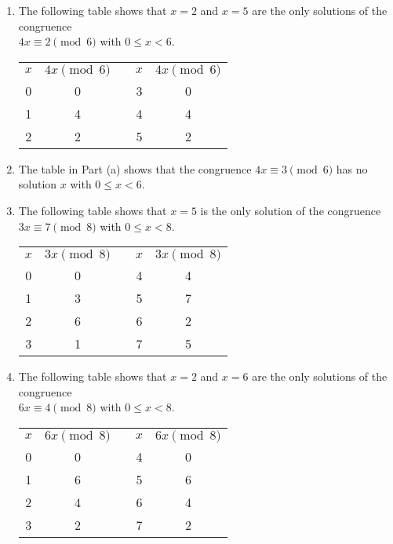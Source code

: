 \documentclass[11pt]{article}
\begin{document}
\begin{enumerate}
  \item The following table shows that $x = 2$ and  $x = 5$ are the only solutions of the congruence \\ $4x \equiv 2 \pmod 6$ with $0 \leq x < 6$.

\begin{center}
\begin{tabular}[t]{ c | c  c  c | c } 
$x$  &  $4x \pmod 6$ & & $x$  &  $4x \pmod 6$ \\ \cline{1-2} \cline{4-5}
0  &  0  &  &  3  &  0 \\ \cline{1-2} \cline{4-5}
1  &  4  &  &  4  &  4 \\ \cline{1-2} \cline{4-5}
2  &  2  &  &  5  &  2 \\ \cline{1-2} \cline{4-5}
\end{tabular}
\end{center}


  \item The table in Part (a) shows that the congruence $4x \equiv 3 \pmod 6$ has no solution $x$ with $0 \leq x < 6$.



\item The following table shows that $x = 5$  is the only solution of the congruence \\ $3x \equiv 7 \pmod 8$ with $0 \leq x < 8$.

\begin{center}
\begin{tabular}[t]{ c | c  c  c | c } 
$x$  &  $3x \pmod 8$ & & $x$  &  $3x \pmod 8$ \\ \cline{1-2} \cline{4-5}
0  &  0  &  &  4  &  4 \\ \cline{1-2} \cline{4-5}
1  &  3  &  &  5  &  7 \\ \cline{1-2} \cline{4-5}
2  &  6  &  &  6  &  2 \\ \cline{1-2} \cline{4-5}
3  &  1  &  &  7  &  5 \\ \cline{1-2} \cline{4-5}
\end{tabular}
\end{center}


\item The following table shows that $x = 2$ and  $x = 6$ are the only solutions of the congruence \\ $6x \equiv 4 \pmod 8$ with $0 \leq x < 8$.

\begin{center}
\begin{tabular}[t]{ c | c  c  c | c } 
$x$  &  $6x \pmod 8$ & & $x$  &  $6x \pmod 8$ \\ \cline{1-2} \cline{4-5}
0  &  0  &  &  4  &  0 \\ \cline{1-2} \cline{4-5}
1  &  6  &  &  5  &  6 \\ \cline{1-2} \cline{4-5}
2  &  4  &  &  6  &  4 \\ \cline{1-2} \cline{4-5}
3  &  2  &  &  7  &  2 \\ \cline{1-2} \cline{4-5}
\end{tabular}
\end{center}



\end{enumerate}
\end{document}
